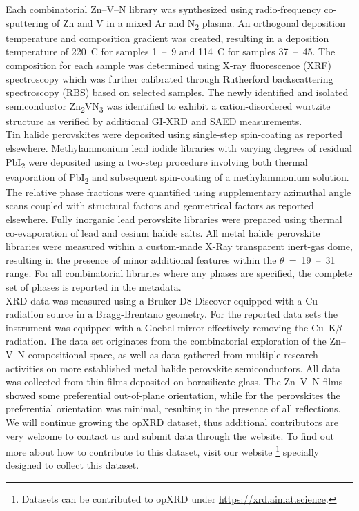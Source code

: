 Each combinatorial Zn–V–N library was synthesized using radio-frequency co-sputtering of Zn and V in a mixed Ar and N\textsubscript{2} plasma. An orthogonal deposition temperature and composition gradient was created, resulting in a deposition temperature of 220~{\textdegree}C for samples 1~–~9 and 114~{\textdegree}C for samples 37~–~45. The composition for each sample was determined using X-ray fluorescence (XRF) spectroscopy which was further calibrated through Rutherford backscattering spectroscopy (RBS) based on selected samples. The newly identified and isolated semiconductor Zn\textsubscript{2}VN\textsubscript{3} was identified to exhibit a cation-disordered wurtzite structure as verified by additional GI-XRD and SAED measurements. \cite{Zhuk2021} \\
Tin halide perovskites were deposited using single-step spin-coating as reported elsewhere.\cite{Wieczorek2023} Methylammonium lead iodide libraries with varying degrees of residual PbI\textsubscript{2} were deposited using a two-step procedure involving both thermal evaporation of PbI\textsubscript{2} and subsequent spin-coating of a methylammonium solution. The relative phase fractions were quantified using supplementary azimuthal angle scans coupled with structural factors and geometrical factors as reported elsewhere.\cite{Wieczorek2024} Fully inorganic lead perovskite libraries were prepared using thermal co-evaporation of lead and cesium halide salts.
All metal halide perovskite libraries were measured within a custom-made X-Ray transparent inert-gas dome, resulting in the presence of minor additional features within the $\theta$~=~19~–~31{\textdegree} range. For all combinatorial libraries where any phases are specified, the complete set of phases is reported in the metadata. \\

XRD data was measured using a Bruker D8 Discover equipped with a Cu radiation source in a Bragg-Brentano geometry. For the reported data sets the instrument was equipped with a Goebel mirror effectively removing the Cu~K$\beta$ radiation. The data set originates from the combinatorial exploration of the Zn–V–N compositional space, as well as data gathered from multiple research activities on more established metal halide perovskite semiconductors. All data was collected from thin films deposited on borosilicate glass. The Zn–V–N films showed some preferential out-of-plane orientation, while for the perovskites the preferential orientation was minimal, resulting in the presence of all reflections. \\


We will continue growing the opXRD dataset, thus additional contributors are very welcome to contact us and submit data through the website. To find out more about how to contribute to this dataset, visit our website \footnote{Datasets can be contributed to opXRD under \url{https://xrd.aimat.science}.} specially designed to collect this dataset.